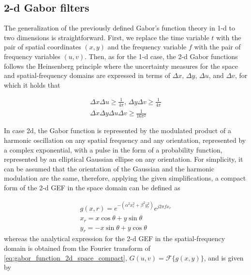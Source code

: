 \subsection{2-d Gabor filters}

The generalization of the previously defined Gabor's function theory in 1-d to two dimensions is straightforward. First, we replace the time variable $t$ with the pair of spatial coordinates $(x, y)$ and the frequency variable $f$ with the pair of frequency variables $(u, v)$. Then, as for the 1-d case, the 2-d Gabor functions follows the Heinsenberg principle where the uncertainty measures for the space and spatial-frequency domains are expressed in terms of $\Delta x$, $\Delta y$, $\Delta u$, and $\Delta v$, for which it holds that

\begin{equation}\label{eq:uncertainty_principle_2d}
    \begin{gathered}
        \Delta x\Delta u \geq \frac{1}{4\pi}, \, \Delta y\Delta v \geq \frac{1}{4\pi} \\
        \Delta x \Delta y \Delta u \Delta v \geq \frac{1}{16\pi^2}
    \end{gathered}
\end{equation}

In case 2d, the Gabor function is represented by the modulated product of a harmonic oscillation on any spatial frequency and any orientation, represented by a complex exponential, with a pulse in the form of a probability function, represented by an elliptical Gaussian ellipse on any orientation. For simplicity, it can be assumed that the orientation of the Gaussian and the harmonic modulation are the same, therefore, applying the given simplifications, a compact form of the 2-d GEF in the space domain can be defined as

\begin{equation}\label{eq:gabor_function_2d_space_compact}
    \begin{gathered}
        g(x, r) =  e ^{-\left(\alpha^2 x_r^2 + \beta^2 y_r^2\right)} e ^{j 2 \pi f x_r } \\
        x_r = x \cos{\theta} + y \sin{\theta}\\
        y_r = -x \sin{\theta} + y \cos{\theta}
     \end{gathered}
\end{equation}
whereas the analytical expression for the 2-d GEF in the spatial-frequency domain is obtained from the Fourier transform of \eqref{eq:gabor_function_2d_space_compact}, $G(u, v) = \mathcal{F}\{g(x, y)\}$, and is given by 

